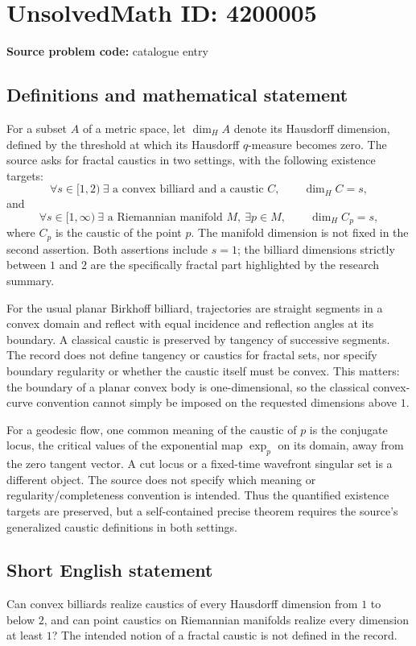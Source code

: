 \documentclass[11pt]{article}
\begin{document}
\section*{UnsolvedMath ID: 4200005}
\textbf{Source problem code:} catalogue entry
\subsection{Definitions and mathematical statement}
For a subset $A$ of a metric space, let $\dim_H A$ denote its Hausdorff dimension, defined by the threshold at which its Hausdorff $q$-measure becomes zero. The source asks for fractal caustics in two settings, with the following existence targets:
\[
\forall s\in[1,2)\ \exists\text{ a convex billiard and a caustic }C,
\qquad \dim_H C=s,
\]
and
\[
\forall s\in[1,\infty)\ \exists\text{ a Riemannian manifold }M,
\ \exists p\in M,\qquad \dim_H C_p=s,
\]
where $C_p$ is the caustic of the point $p$. The manifold dimension is not fixed in the second assertion. Both assertions include $s=1$; the billiard dimensions strictly between $1$ and $2$ are the specifically fractal part highlighted by the research summary.

For the usual planar Birkhoff billiard, trajectories are straight segments in a convex domain and reflect with equal incidence and reflection angles at its boundary. A classical caustic is preserved by tangency of successive segments. The record does not define tangency or caustics for fractal sets, nor specify boundary regularity or whether the caustic itself must be convex. This matters: the boundary of a planar convex body is one-dimensional, so the classical convex-curve convention cannot simply be imposed on the requested dimensions above $1$.

For a geodesic flow, one common meaning of the caustic of $p$ is the conjugate locus, the critical values of the exponential map $\exp_p$ on its domain, away from the zero tangent vector. A cut locus or a fixed-time wavefront singular set is a different object. The source does not specify which meaning or regularity/completeness convention is intended. Thus the quantified existence targets are preserved, but a self-contained precise theorem requires the source's generalized caustic definitions in both settings.
\subsection{Short English statement}
Can convex billiards realize caustics of every Hausdorff dimension from $1$ to below $2$, and can point caustics on Riemannian manifolds realize every dimension at least $1$? The intended notion of a fractal caustic is not defined in the record.
\end{document}
